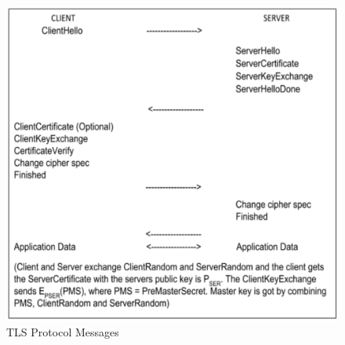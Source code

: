 \begin{figure}[!ht]
\centering
\includegraphics[scale=.75]{src/Figures/chap2/5.eps}
\caption{TLS Protocol Messages}\label{chap2-fig5}
\end{figure}

